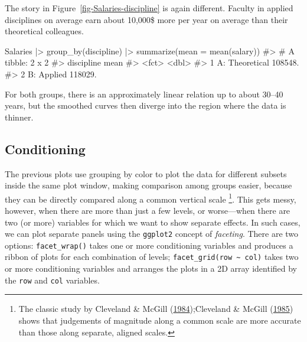 \documentclass[
  letterpaper,
  10pt,
  krantz2]{krantz}
\makeatletter
\newenvironment{Shaded}{\begin{snugshade}}{\end{snugshade}}
\newcommand{\AttributeTok}[1]{\textcolor[rgb]{0.40,0.45,0.13}{#1}}
\newcommand{\CommentTok}[1]{\textcolor[rgb]{0.37,0.37,0.37}{#1}}
\newcommand{\FunctionTok}[1]{\textcolor[rgb]{0.28,0.35,0.67}{#1}}
\newcommand{\NormalTok}[1]{\textcolor[rgb]{0.00,0.23,0.31}{#1}}
\newcommand{\SpecialCharTok}[1]{\textcolor[rgb]{0.37,0.37,0.37}{#1}}
\newenvironment{kframe}{%
  \medskip{}
  \setlength{\fboxsep}{.8em}
  \def\at@end@of@kframe{}%
  \ifinner\ifhmode%
  \def\at@end@of@kframe{\end{minipage}}%
  \begin{minipage}{\columnwidth}%
  \fi\fi%
  \def\FrameCommand##1{\hskip\@totalleftmargin \hskip-\fboxsep
  \colorbox{shadecolor}{##1}\hskip-\fboxsep
      \hskip-\linewidth \hskip-\@totalleftmargin \hskip\columnwidth}%
  \MakeFramed {\advance\hsize-\width
    \@totalleftmargin\z@ \linewidth\hsize
    \@setminipage}}%
{\par\unskip\endMakeFramed%
  \at@end@of@kframe}
\renewenvironment{Shaded}{\begin{kframe}}{\end{kframe}}
\makeatother
\begin{document}
The story in Figure~\ref{fig-Salaries-discipline} is again different.
Faculty in applied disciplines on average earn about 10,000\$ more per
year on average than their theoretical colleagues.

\begin{Shaded}
\begin{Highlighting}[]
\NormalTok{Salaries }\SpecialCharTok{|\textgreater{}}
  \FunctionTok{group\_by}\NormalTok{(discipline) }\SpecialCharTok{|\textgreater{}}
  \FunctionTok{summarize}\NormalTok{(}\AttributeTok{mean =} \FunctionTok{mean}\NormalTok{(salary)) }
\CommentTok{\#\textgreater{} \# A tibble: 2 x 2}
\CommentTok{\#\textgreater{}   discipline        mean}
\CommentTok{\#\textgreater{}   \textless{}fct\textgreater{}            \textless{}dbl\textgreater{}}
\CommentTok{\#\textgreater{} 1 A: Theoretical 108548.}
\CommentTok{\#\textgreater{} 2 B: Applied     118029.}
\end{Highlighting}
\end{Shaded}

For both groups, there is an approximately linear relation up to about
30--40 years, but the smoothed curves then diverge into the region where
the data is thinner.

\hypertarget{conditioning}{%
\subsection{Conditioning}\label{conditioning}}

The previous plots use grouping by color to plot the data for different
subsets inside the same plot window, making comparison among groups
easier, because they can be directly compared along a common vertical
scale \footnote{The classic study by Cleveland \& McGill
  (\protect\hyperlink{ref-ClevelandMcGill:84b}{1984});Cleveland \&
  McGill (\protect\hyperlink{ref-ClevelandMcGill:85}{1985}) shows that
  judgements of magnitude along a common scale are more accurate than
  those along separate, aligned scales.}. This gets messy, however, when
there are more than just a few levels, or worse---when there are two (or
more) variables for which we want to show separate effects. In such
cases, we can plot separate panels using the \texttt{ggplot2} concept of
\emph{faceting}. There are two options: \texttt{facet\_wrap()} takes one
or more conditioning variables and produces a ribbon of plots for each
combination of levels; \texttt{facet\_grid(row\ \textasciitilde{}\ col)}
takes two or more conditioning variables and arranges the plots in a 2D
array identified by the \texttt{row} and \texttt{col} variables.
\end{document}

